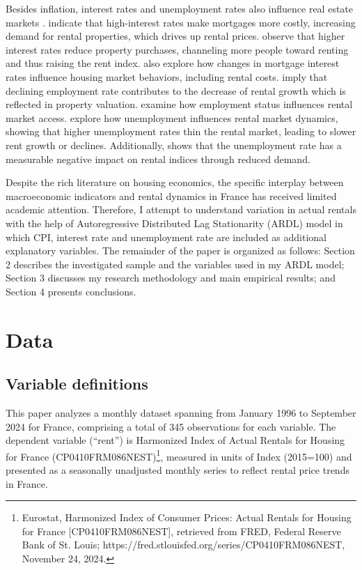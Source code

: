 \documentclass[12pt, times]{article}
\begin{document}
Besides inflation, interest rates and unemployment rates also influence real estate markets \citep{cucurachius}. \cite{case2000real} indicate that high-interest rates make mortgages more costly, increasing demand for rental properties, which drives up rental prices. \cite{hardin2012reit} observe that higher interest rates reduce property purchases, channeling more people toward renting and thus raising the rent index. \cite{lin2021house} also explore how changes in mortgage interest rates influence housing market behaviors, including rental costs. \cite{bouchouicha2012real} imply that declining employment rate contributes to the decrease of rental growth which is reflected in property valuation. \cite{carlsson2014discrimination} examine how employment status influences rental market access. \cite{gan2018market} explore how unemployment influences rental market dynamics, showing that higher unemployment rates thin the rental market, leading to slower rent growth or declines. Additionally, \cite{usta2021impact} shows that the unemployment rate has a measurable negative impact on rental indices through reduced demand.

Despite the rich literature on housing economics, the specific interplay between macroeconomic indicators and rental dynamics in France has received limited academic attention. Therefore, I attempt to understand variation in actual rentals with the help of Autoregressive Distributed Lag Stationarity (ARDL) model in which CPI, interest rate and unemployment rate are included as additional explanatory variables. The remainder of the paper is organized as follows: Section 2 describes the investigated sample and the variables used in my ARDL model; Section 3 discusses my research methodology and main empirical results; and Section 4 presents conclusions.
\vspace{-1.5em}
\section{Data}
\vspace{-1.0em}
\subsection{Variable definitions}
This paper analyzes a monthly dataset spanning from January 1996 to September 2024 for France, comprising a total of 345 observations for each variable. The dependent variable (``rent'') is Harmonized Index of Actual Rentals for Housing for France (CP0410FRM086NEST)\footnote{Eurostat, Harmonized Index of Consumer Prices: Actual Rentals for Housing for France [CP0410FRM086NEST], retrieved from FRED, Federal Reserve Bank of St. Louis; https://fred.stlouisfed.org/series/CP0410FRM086NEST, November 24, 2024.}, measured in units of Index (2015=100) and presented as a seasonally unadjusted monthly series to reflect rental price trends in France.
\end{document}
